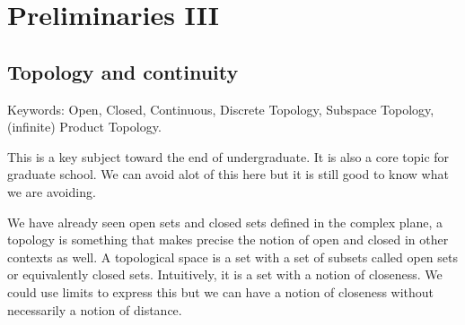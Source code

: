 \documentclass{article}
\theoremstyle{definition}
\theoremstyle{definition}
\theoremstyle{definition}
\begin{document}

   














\section{Preliminaries III}



\subsection{Topology and continuity} 

Keywords: Open, Closed, Continuous, Discrete Topology, Subspace Topology, (infinite) Product Topology.

This is a key subject toward the end of undergraduate. It is also a core topic for graduate school. We can avoid alot of this here but it is still good to know what we are avoiding.

We have already seen open sets and closed sets defined in the complex plane, a topology is something that makes precise the notion of open and closed in other contexts as well. A topological space is a set with a set of subsets called open sets or equivalently closed sets. Intuitively, it is a set with a notion of closeness. We could use limits to express this but we can have a notion of closeness without necessarily a notion of distance.
\end{document}

